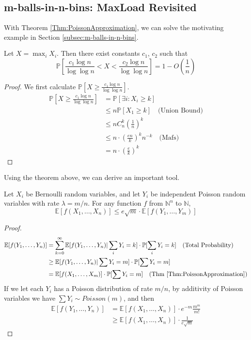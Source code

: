     \subsection{m-balls-in-n-bins: MaxLoad Revisited}
        With Theorem \ref{Thm:PoissonApproximation}, we can solve the motivating example in Section \ref{subsec:m-balls-in-n-bins}.
        \begin{theorem}
            Let $X = \max_i X_i$. Then there exist constants $c_1$, $c_2$ such that
            \[ \mathbb{P}\left[\frac{c_1\log n}{\log\log n} < X < \frac{c_2\log n}{\log\log n}\right] = 1 - O\left(\frac{1}{n}\right) \]
        \end{theorem}
        \begin{proof}
            We first calculate $\mathbb{P}\left[ X \ge \frac{c_1\log n}{\log\log n} \right]$.
            \begin{align*}
                \mathbb{P}\left[ X \ge \frac{c_1\log n}{\log\log n} \right] &= \mathbb{P}[\exists i: X_i \ge k]\\
                &\le n\mathbb{P}[X_1 \ge k] \quad \text{(Union Bound)}\\
                &\le n C^k_n\left(\frac{1}{n}\right)^k\\
                &\le n\cdot \left(\frac{en}{k}\right)^k n^{-k} \quad \text{(Mafs)}\\
                &= n\cdot\left(\frac{e}{k}\right)^k
            \end{align*}
        \end{proof}
        Using the theorem above, we can derive an important tool.
        \begin{theorem}
            Let $X_i$ be Bernoulli random variables, and let $Y_i$ be independent Poisson random variables with rate $\lambda = m/n$. For any function $f$ from $\mathbb{N}^n$ to $\mathbb{N}$,
            \[ \mathbb{E}[f(X_1, \dots, X_n)] \le e\sqrt{m}\cdot\mathbb{E}[f(Y_1,\dots,Y_m)] \]
        \end{theorem}
        \begin{proof}
            \begin{align*}
                \mathbb{E}[f(Y_1,\dots,Y_n)] &= \sum_{k=0}^{\infty}\mathbb{E}[f(Y_1,\dots,Y_n) | \sum_i Y_i = k] \cdot \mathbb{P}[\sum_i Y_i = k] \quad \text{(Total Probability)}\\
                &\ge \mathbb{E}[f(Y_1,\dots,Y_n)|\sum Y_i = m]\cdot \mathbb{P}[\sum Y_i = m]\\
                &= \mathbb{E}[f(X_1,\dots,X_m)]\cdot\mathbb{P}[\sum Y_i = m] \quad \text{(Thm \ref{Thm:PoissonApproximation})}
            \end{align*}
            If we let each $Y_i$ has a Poisson distribution of rate $m/n$, by additivity of Poisson variables we have $\sum Y_i \sim Poisson(m)$, and then
            \begin{align*}
                \mathbb{E}[f(Y_1,\dots,Y_n)] &= \mathbb{E}[f(X_1,\dots,X_n)]\cdot e^{-m}\frac{m^m}{m!}\\
                &\ge \mathbb{E}[f(X_1,\dots,X_n)]\cdot\frac{1}{e\sqrt{m}}
            \end{align*}
        \end{proof}
